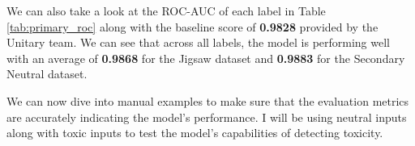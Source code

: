 \begin{table}[ht]
    \centering
    \vspace{5pt}
    \caption{ROC-AUC scores collected from the Primary model using the Primary and Secondary Neutral datasets}
    \label{tab:primary_roc}
\end{table}

We can also take a look at the ROC-AUC of each label in Table \ref{tab:primary_roc} along with the baseline score of \textbf{0.9828} provided by the Unitary team. We can see that across all labels, the model is performing well with an average of \textbf{0.9868} for the Jigsaw dataset and \textbf{0.9883} for the Secondary Neutral dataset.

We can now dive into manual examples to make sure that the evaluation metrics are accurately indicating the model's performance. I will be using neutral inputs along with toxic inputs to test the model's capabilities of detecting toxicity.

